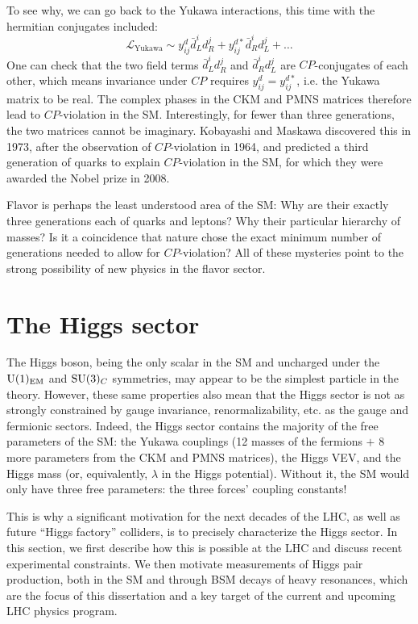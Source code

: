 To see why, we can go back to the Yukawa interactions, this time with the hermitian conjugates included:
\begin{equation}
	\label{eq:01_sm_ew_yukawa_hermitian}
	\mathcal{L}_{\mathrm{Yukawa}} \sim y^d_{ij} \bar d^i_L d^j_R + y^{d*}_{ij} \bar d^i_R d^j_L + \ldots
\end{equation}
One can check that the two field terms $\bar d^i_L d^j_R$ and $\bar d^i_R d^j_L$ are $CP$-conjugates of each other, which means invariance under $CP$ requires $y^d_{ij} = y^{d*}_{ij}$, i.e. the Yukawa matrix to be real.
The complex phases in the CKM and PMNS matrices therefore lead to $CP$-violation in the SM.
Interestingly, for fewer than three generations, the two matrices cannot be imaginary.
Kobayashi and Maskawa discovered this in 1973, after the observation of $CP$-violation in 1964, and predicted a third generation of quarks to explain $CP$-violation in the SM, for which they were awarded the Nobel prize in 2008.

Flavor is perhaps the least understood area of the SM:
Why are their exactly three generations each of quarks and leptons? 
Why their particular hierarchy of masses?
Is it a coincidence that nature chose the exact minimum number of generations needed to allow for $CP$-violation?
All of these mysteries point to the strong possibility of new physics in the flavor sector.


\section{The Higgs sector}
\label{sec:01_higgs}

The Higgs boson, being the only scalar in the SM and uncharged under the $\UU[1]_{\mathrm{EM}}$ and $\SU[3]_C$ symmetries, may appear to be the simplest particle in the theory.
However, these same properties also mean that the Higgs sector is not as strongly constrained by gauge invariance, renormalizability, etc. as the gauge and fermionic sectors.
Indeed, the Higgs sector contains the majority of the free parameters of the SM: the Yukawa couplings (12 masses of the fermions $+$ 8 more parameters from the CKM and PMNS matrices), the Higgs VEV, and the Higgs mass (or, equivalently, $\lambda$ in the Higgs potential).
Without it, the SM would only have three free parameters: the three forces' coupling constants!

This is why a significant motivation for the next decades of the LHC, as well as future ``Higgs factory'' colliders, is to precisely characterize the Higgs sector.
In this section, we first describe how this is possible at the LHC and discuss recent experimental constraints.
We then motivate measurements of Higgs pair production, both in the SM and through BSM decays of heavy resonances, which are the focus of this dissertation and a key target of the current and upcoming LHC physics program.

